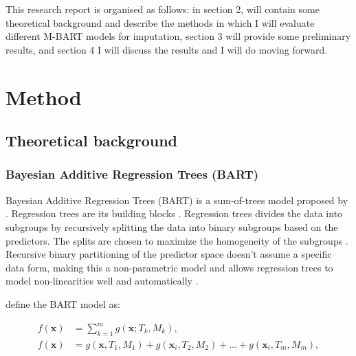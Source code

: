 \documentclass[10pt, a4paper, titlepage]{article}
\begin{document}
This research report is organised as follows: in section 2, will contain some theoretical background and describe the methods in which I will evaluate different M-BART models for imputation, section 3 will provide some preliminary results, and section 4 I will discuss the results and I will do moving forward.

\section{Method}

\subsection{Theoretical background}
\subsubsection{Bayesian Additive Regression Trees (BART)}
Bayesian Additive Regression Trees (BART) is a sum-of-trees model proposed by \citet{chipman2010}. Regression trees are its building blocks \citep{chipman2010, hill2020, james2021}. Regression trees divides the data into subgroups by recursively splitting the data into binary subgroups based on the predictors. The splits are chosen to maximize the homogeneity of the subgroups \citep{hastie2017, james2021, salditt2023}. Recursive binary partitioning of the predictor space doesn't assume a specific data form, making this a non-parametric model \citep{hastie2017, james2021, salditt2023} and allows regression trees to model non-linearities well and automatically \citep{hill2020, burgette2010}.

\citet{chipman2010} define the BART model as:

\begin{subequations}
\label{eq:BART}
\begin{align}
f(\textbf{x}) &= \sum^{m}_{k=1}g(\textbf{x}; T_{k}, M_{k}), \tag{1.1} \\
f(\textbf{x}) &= g(\textbf{x}, T_{1}, M_{1}) + g(\textbf{x}_{i}, T_{2}, M_{2}) + \dots + g(\textbf{x}_{i}, T_{m}, M_{m}), \tag{1.2}
\end{align}
\end{subequations}
\end{document}
